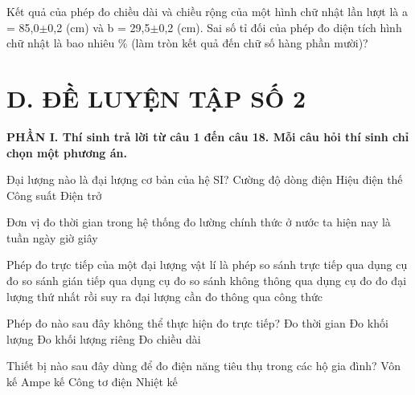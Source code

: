 \begin{ex} Kết quả của phép đo chiều dài và chiều rộng của một hình chữ nhật lần lượt là
a = 85,0$\pm$0,2 (cm) và b = 29,5$\pm$0,2 (cm). Sai số tỉ đối của phép đo diện tích hình chữ nhật
là bao nhiêu \% (làm tròn kết quả đến chữ số hàng phần mười)?

\par{}
\end{ex}

\section*{D. ĐỀ LUYỆN TẬP SỐ 2}

\noindent\textbf{\large PHẦN I. Thí sinh trả lời từ câu 1 đến câu 18. Mỗi câu hỏi thí sinh chỉ chọn một phương án.}\par\vspace{0.2cm}
\begin{ex} Đại lượng nào là đại lượng cơ bản của hệ SI?
\choice
{\True Cường độ dòng điện}
{Hiệu điện thế}
{Công suất}
{Điện trở}
\loigiai{}
\end{ex}

\begin{ex} Đơn vị đo thời gian trong hệ thống đo lường chính thức ở nước ta hiện nay là
\choice
{tuần}
{ngày}
{giờ}
{\True giây}
\loigiai{}
\end{ex}

\begin{ex} Phép đo trực tiếp của một đại lượng vật lí là phép
\choice
{\True so sánh trực tiếp qua dụng cụ đo}
{so sánh gián tiếp qua dụng cụ đo}
{so sánh không thông qua dụng cụ đo}
{đo đại lượng thứ nhất rồi suy ra đại lượng cần đo thông qua công thức}
\loigiai{}
\end{ex}

\begin{ex} Phép đo nào sau đây không thể thực hiện đo trực tiếp?
\choice
{Đo thời gian}
{Đo khối lượng}
{\True Đo khối lượng riêng}
{Đo chiều dài}
\loigiai{}
\end{ex}

\begin{ex} Thiết bị nào sau đây dùng để đo điện năng tiêu thụ trong các hộ gia đình?
\choice
{Vôn kế}
{Ampe kế}
{\True Công tơ điện}
{Nhiệt kế}
\loigiai{}
\end{ex}

